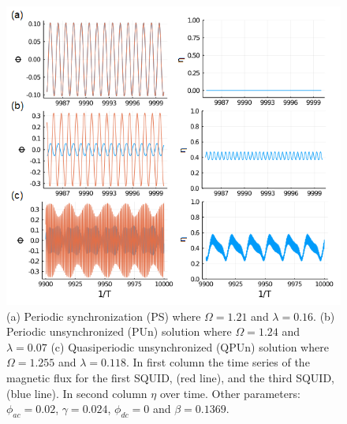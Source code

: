 \documentclass[aps,pre,reprint,groupedaddress]{revtex4-1}
\begin{document}
\begin{figure}
	\includegraphics[scale=0.55]{Fig04_A}%
	\caption{(a) Periodic synchronization (PS) where $\Omega = 1.21$ and $\lambda=0.16$. (b) Periodic unsynchronized (PUn) solution where $\Omega = 1.24$ and $\lambda=0.07$ (c) Quasiperiodic unsynchronized (QPUn) solution where $\Omega = 1.255$ and $\lambda=0.118$. In first column the time series of the magnetic flux for the first SQUID, (red line), and the third SQUID, (blue line). In second column $\eta$ over time. Other parameters: $\phi_{ac}=0.02$, $\gamma=0.024$, $\phi_{dc}=0$ and $\beta=0.1369$.} \label{fig04}
\end{figure}
\end{document}
